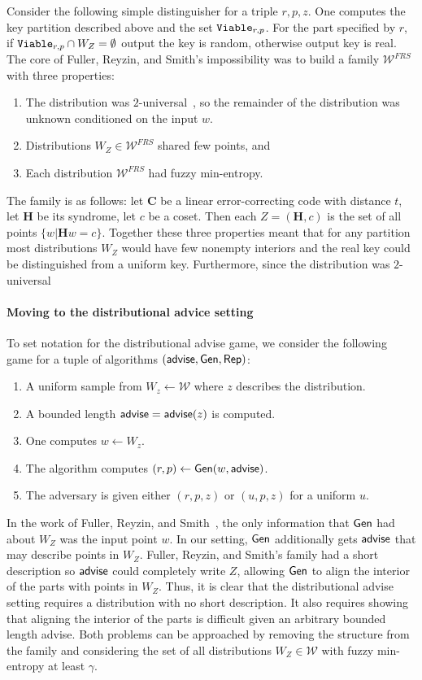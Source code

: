 Consider the following simple distinguisher for a triple $r, p, z$.  One computes the key partition described above and the set $\mathtt{Viable}_{r,p}$. For the part specified by $r$, if $\mathtt{Viable}_{r,p} \cap W_Z =\emptyset$ output the key is random, otherwise output key is real.
The core of Fuller, Reyzin, and Smith's impossibility was to build a family $\mathcal{W}^{FRS}$ with three properties:
\begin{enumerate}
\item The distribution was $2$-universal~\cite{carter1977universal}, so the remainder of the distribution was unknown conditioned on the input $w$. 
\item Distributions $W_Z \in \mathcal{W}^{FRS}$ shared few points, and 
\item Each distribution $\mathcal{W}^{FRS}$ had fuzzy min-entropy.
\end{enumerate}
The family is as follows: let $\mathbf{C}$ be a linear error-correcting code with distance $t$, let $\mathbf{H}$ be its syndrome, let $c$ be a coset.  Then each $Z = (\mathbf{H}, c)$ is the set of all points $\{w | \mathbf{H} w = c\}$.
Together these three properties meant that for any partition most distributions $W_Z$ would have few nonempty interiors and the real key could be distinguished from a uniform key.  Furthermore, since the distribution was $2$-universal

\paragraph{Moving to the distributional advice setting}
To set notation for the distributional advise game, we consider the following game for a tuple of algorithms $({\mathsf{advise}}, {\mathsf{Gen}}, {\mathsf{Rep}})$:
\begin{enumerate}
\itemsep0em
\item A uniform sample from $W_z\leftarrow \mathcal{W}$ where $z$ describes the distribution.
\item A bounded length ${\mathsf{advise}} = {\mathsf{advise}}(z)$ is computed.
\item One computes $w\leftarrow W_z$.
\item The algorithm computes $(r, p)\leftarrow {\ensuremath{\mathsf{Gen}}}(w, {\mathsf{advise}})$.
\item The adversary is given either $(r, p, z)$ or $(u, p, z)$ for a uniform $u$.
\end{enumerate}

In the work of Fuller, Reyzin, and Smith~\cite{fuller2020fuzzy}, the only information that ${\mathsf{Gen}}$ had about $W_Z$ was the input point $w$.  In our setting, ${\mathsf{Gen}}$ additionally gets ${\mathsf{advise}}$ that may describe points in $W_Z$.  Fuller, Reyzin, and Smith's family had a short description so ${\mathsf{advise}}$ could completely write $Z$, allowing ${\mathsf{Gen}}$ to align the interior of the parts with points in $W_Z$.  Thus, it is clear that the distributional advise setting requires a distribution with no short description.  It also requires showing that aligning the interior of the parts is difficult given an arbitrary bounded length advise.  Both problems can be approached by removing the structure from the family and considering the set of all distributions $W_Z\in\mathcal{W}$ with fuzzy min-entropy at least $\gamma$. 

